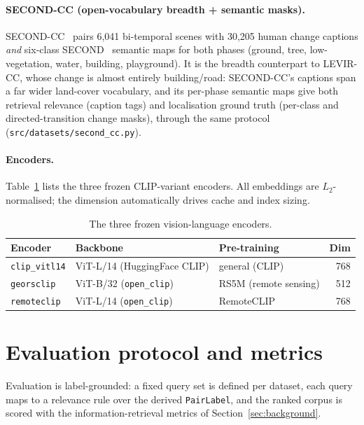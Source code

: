 \documentclass{article}
\begin{document}
\paragraph{SECOND-CC (open-vocabulary breadth + semantic masks).}
SECOND-CC~\cite{secondcc} pairs 6{,}041 bi-temporal scenes with 30{,}205 human
change captions \emph{and} six-class SECOND~\cite{second} semantic maps for both
phases (ground, tree, low-vegetation, water, building, playground). It is the
breadth counterpart to LEVIR-CC, whose change is almost entirely building/road:
SECOND-CC's captions span a far wider land-cover vocabulary, and its per-phase
semantic maps give both retrieval relevance (caption tags) and localisation
ground truth (per-class and directed-transition change masks), through the same
protocol (\texttt{src/datasets/second\_cc.py}).

\paragraph{Encoders.}
Table~\ref{tab:encoders} lists the three frozen CLIP-variant encoders. All
embeddings are $L_2$-normalised; the dimension automatically drives cache and
index sizing.

\begin{table}[H]
    \centering
    \caption{The three frozen vision-language encoders.}
    \label{tab:encoders}
    \begin{tabular}{lllr}
        \toprule
        \textbf{Encoder} & \textbf{Backbone} & \textbf{Pre-training} & \textbf{Dim} \\
        \midrule
        \texttt{clip\_vitl14} & ViT-L/14 (HuggingFace CLIP)        & general (CLIP)       & 768 \\
        \texttt{georsclip}    & ViT-B/32 (\texttt{open\_clip})     & RS5M (remote sensing) & 512 \\
        \texttt{remoteclip}   & ViT-L/14 (\texttt{open\_clip})     & RemoteCLIP            & 768 \\
        \bottomrule
    \end{tabular}
\end{table}


\section{Evaluation protocol and metrics}
\label{sec:eval}

Evaluation is label-grounded: a fixed query set is defined per dataset, each
query maps to a relevance rule over the derived \texttt{PairLabel}, and the
ranked corpus is scored with the information-retrieval metrics of
Section~\ref{sec:background}.
\end{document}

